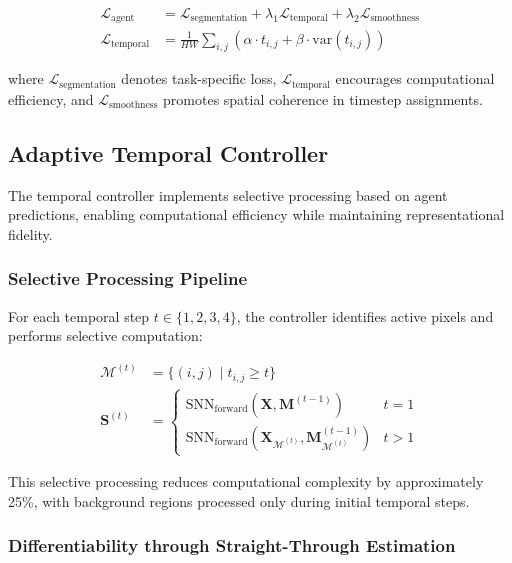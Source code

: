 \documentclass[12pt,a4paper]{article}
\begin{document}
\begin{align}
\mathcal{L}_{\text{agent}} &= \mathcal{L}_{\text{segmentation}} + \lambda_1 \mathcal{L}_{\text{temporal}} + \lambda_2 \mathcal{L}_{\text{smoothness}} \\
\mathcal{L}_{\text{temporal}} &= \frac{1}{HW} \sum_{i,j} \left( \alpha \cdot t_{i,j} + \beta \cdot \text{var}(t_{i,j}) \right)
\end{align}

where $\mathcal{L}_{\text{segmentation}}$ denotes task-specific loss, $\mathcal{L}_{\text{temporal}}$ encourages computational efficiency, and $\mathcal{L}_{\text{smoothness}}$ promotes spatial coherence in timestep assignments.

\subsection{Adaptive Temporal Controller}

The temporal controller implements selective processing based on agent predictions, enabling computational efficiency while maintaining representational fidelity.

\subsubsection{Selective Processing Pipeline}

For each temporal step $t \in \{1, 2, 3, 4\}$, the controller identifies active pixels and performs selective computation:

\begin{align}
\mathcal{M}^{(t)} &= \{ (i,j) \mid t_{i,j} \geq t \} \\
\mathbf{S}^{(t)} &= \begin{cases}
\text{SNN}_{\text{forward}}(\mathbf{X}, \mathbf{M}^{(t-1)}) & t = 1 \\
\text{SNN}_{\text{forward}}(\mathbf{X}_{\mathcal{M}^{(t)}}, \mathbf{M}^{(t-1)}_{\mathcal{M}^{(t)}}) & t > 1
\end{cases}
\end{align}

This selective processing reduces computational complexity by approximately 25\%, with background regions processed only during initial temporal steps.

\subsubsection{Differentiability through Straight-Through Estimation}
\end{document}
